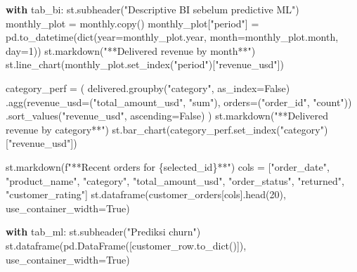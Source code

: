 \documentclass[
  indonesian,
  letterpaper,
  DIV=11,
  numbers=noendperiod]{scrreprt}
\newenvironment{Shaded}{\begin{snugshade}}{\end{snugshade}}
\newcommand{\BuiltInTok}[1]{\textcolor[rgb]{0.00,0.23,0.31}{#1}}
\newcommand{\ControlFlowTok}[1]{\textcolor[rgb]{0.00,0.23,0.31}{\textbf{#1}}}
\newcommand{\DecValTok}[1]{\textcolor[rgb]{0.68,0.00,0.00}{#1}}
\newcommand{\NormalTok}[1]{\textcolor[rgb]{0.00,0.23,0.31}{#1}}
\newcommand{\OperatorTok}[1]{\textcolor[rgb]{0.37,0.37,0.37}{#1}}
\newcommand{\SpecialCharTok}[1]{\textcolor[rgb]{0.37,0.37,0.37}{#1}}
\newcommand{\SpecialStringTok}[1]{\textcolor[rgb]{0.13,0.47,0.30}{#1}}
\newcommand{\StringTok}[1]{\textcolor[rgb]{0.13,0.47,0.30}{#1}}
\newcommand{\VariableTok}[1]{\textcolor[rgb]{0.07,0.07,0.07}{#1}}
\begin{document}
\begin{Shaded}
\begin{Highlighting}[]
\ControlFlowTok{with}\NormalTok{ tab\_bi:}
\NormalTok{    st.subheader(}\StringTok{"Descriptive BI sebelum predictive ML"}\NormalTok{)}
\NormalTok{    monthly\_plot }\OperatorTok{=}\NormalTok{ monthly.copy()}
\NormalTok{    monthly\_plot[}\StringTok{"period"}\NormalTok{] }\OperatorTok{=}\NormalTok{ pd.to\_datetime(}\BuiltInTok{dict}\NormalTok{(year}\OperatorTok{=}\NormalTok{monthly\_plot.year, month}\OperatorTok{=}\NormalTok{monthly\_plot.month, day}\OperatorTok{=}\DecValTok{1}\NormalTok{))}
\NormalTok{    st.markdown(}\StringTok{"**Delivered revenue by month**"}\NormalTok{)}
\NormalTok{    st.line\_chart(monthly\_plot.set\_index(}\StringTok{"period"}\NormalTok{)[}\StringTok{"revenue\_usd"}\NormalTok{])}

\NormalTok{    category\_perf }\OperatorTok{=}\NormalTok{ (}
\NormalTok{        delivered.groupby(}\StringTok{"category"}\NormalTok{, as\_index}\OperatorTok{=}\VariableTok{False}\NormalTok{)}
\NormalTok{        .agg(revenue\_usd}\OperatorTok{=}\NormalTok{(}\StringTok{"total\_amount\_usd"}\NormalTok{, }\StringTok{"sum"}\NormalTok{), orders}\OperatorTok{=}\NormalTok{(}\StringTok{"order\_id"}\NormalTok{, }\StringTok{"count"}\NormalTok{))}
\NormalTok{        .sort\_values(}\StringTok{"revenue\_usd"}\NormalTok{, ascending}\OperatorTok{=}\VariableTok{False}\NormalTok{)}
\NormalTok{    )}
\NormalTok{    st.markdown(}\StringTok{"**Delivered revenue by category**"}\NormalTok{)}
\NormalTok{    st.bar\_chart(category\_perf.set\_index(}\StringTok{"category"}\NormalTok{)[}\StringTok{"revenue\_usd"}\NormalTok{])}

\NormalTok{    st.markdown(}\SpecialStringTok{f"**Recent orders for }\SpecialCharTok{\{}\NormalTok{selected\_id}\SpecialCharTok{\}}\SpecialStringTok{**"}\NormalTok{)}
\NormalTok{    cols }\OperatorTok{=}\NormalTok{ [}\StringTok{"order\_date"}\NormalTok{, }\StringTok{"product\_name"}\NormalTok{, }\StringTok{"category"}\NormalTok{, }\StringTok{"total\_amount\_usd"}\NormalTok{, }\StringTok{"order\_status"}\NormalTok{, }\StringTok{"returned"}\NormalTok{, }\StringTok{"customer\_rating"}\NormalTok{]}
\NormalTok{    st.dataframe(customer\_orders[cols].head(}\DecValTok{20}\NormalTok{), use\_container\_width}\OperatorTok{=}\VariableTok{True}\NormalTok{)}

\ControlFlowTok{with}\NormalTok{ tab\_ml:}
\NormalTok{    st.subheader(}\StringTok{"Prediksi churn"}\NormalTok{)}
\NormalTok{    st.dataframe(pd.DataFrame([customer\_row.to\_dict()]), use\_container\_width}\OperatorTok{=}\VariableTok{True}\NormalTok{)}


\end{Highlighting}
\end{Shaded}
\end{document}
